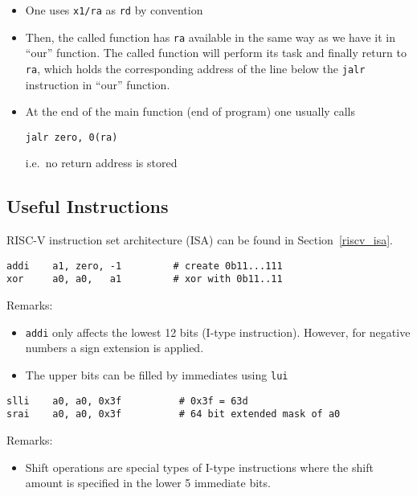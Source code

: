 \begin{itemize}
    \item One uses \texttt{x1/ra} as \texttt{rd} by convention
    \item Then, the called function has \texttt{ra} available in the same way as we have it in ``our'' function. The called function will perform its task and finally return to \texttt{ra}, which holds the corresponding address of the line below the \texttt{jalr} instruction in ``our'' function.
    \item At the end of the main function (end of program) one usually calls
          \begin{lstlisting}[language={[RISC-V]Assembler}]
jalr zero, 0(ra)
    \end{lstlisting}
          i.e.\ no return address is stored
\end{itemize}

\subsection{Useful Instructions}
RISC-V instruction set architecture (ISA)  can be found in Section\ \ref{riscv_isa}.

\newpar{}

\begin{lstlisting}[language={[RISC-V]Assembler}]
addi    a1, zero, -1         # create 0b11...111
xor     a0, a0,   a1         # xor with 0b11..11
\end{lstlisting}
Remarks:
\begin{itemize}
    \item \texttt{addi} only affects the lowest 12 bits (I-type instruction). However, for negative numbers a sign extension is applied.
    \item The upper bits can be filled by immediates using \texttt{lui}
\end{itemize}

\newpar{}

\begin{lstlisting}[language={[RISC-V]Assembler}]
slli    a0, a0, 0x3f          # 0x3f = 63d
srai    a0, a0, 0x3f          # 64 bit extended mask of a0
\end{lstlisting}

Remarks:
\begin{itemize}
    \item Shift operations are special types of I-type instructions where the shift amount is specified in the lower 5 immediate bits.
\end{itemize}

